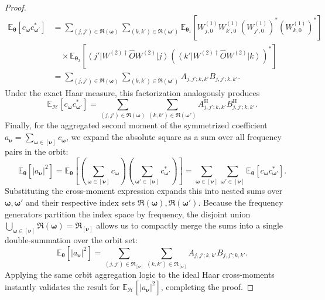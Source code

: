 \documentclass[%
 reprint,
 amsmath,amssymb,
 aps,
 pra,
]{revtex4-2}
\theoremstyle{definition}
\begin{document}
\begin{proof}
\begin{align}
\mathbb{E}_{\bm{\theta}} \left[ c_{\bm{\omega}} c_{\bm{\omega}'}^* \right]
&=
\sum_{(j,j')\in\mathfrak R(\bm{\omega})} \sum_{(k,k')\in\mathfrak R(\bm{\omega}')}
\mathbb{E}_{\bm{\theta}_1} \left[ W^{(1)}_{j,0} W^{(1)}_{k',0} \left(W^{(1)}_{j',0}\right)^* \left(W^{(1)}_{k,0}\right)^* \right] \nonumber \\
&\quad \times
\mathbb{E}_{\bm{\theta}_2} \left[ \left\langle j'\right| W^{(2)\dagger}\hat O W^{(2)} \left|j\right\rangle \left( \left\langle k'\right| W^{(2)\dagger}\hat O W^{(2)} \left|k\right\rangle \right)^* \right] \nonumber \\
&=
\sum_{(j,j')\in\mathfrak R(\bm{\omega})} \sum_{(k,k')\in\mathfrak R(\bm{\omega}')} A_{j,j';k,k'} B_{j,j';k,k'}.
\end{align}
Under the exact Haar measure, this factorization analogously produces
\begin{equation}
\mathbb{E}_{\mathcal{H}} [ c_{\bm{\omega}} c_{\bm{\omega}'}^* ] = \sum_{(j,j')\in\mathfrak R(\bm{\omega})} \sum_{(k,k')\in\mathfrak R(\bm{\omega}')}  A^{\mathrm{H}}_{j,j';k,k'} B^{\mathrm{H}}_{j,j';k,k'}.
\end{equation}
Finally, for the aggregated second moment of the symmetrized coefficient $a_{\bm{\nu}} = \sum_{\bm{\omega}\in[\bm{\nu}]} c_{\bm{\omega}}$, we expand the absolute square as a sum over all frequency pairs in the orbit:
\begin{equation}
\mathbb{E}_{\bm{\theta}} \left[ |a_{\bm{\nu}}|^2 \right]
=
\mathbb{E}_{\bm{\theta}} \left[ \left( \sum_{\bm{\omega}\in[\bm{\nu}]} c_{\bm{\omega}} \right) \left( \sum_{\bm{\omega}'\in[\bm{\nu}]} c_{\bm{\omega}'}^* \right) \right]
=
\sum_{\bm{\omega}\in[\bm{\nu}]} \sum_{\bm{\omega}'\in[\bm{\nu}]} \mathbb{E}_{\bm{\theta}} \left[ c_{\bm{\omega}} c_{\bm{\omega}'}^* \right].
\end{equation}
Substituting the cross-moment expression expands this into nested sums over $\bm{\omega}, \bm{\omega}'$ and their respective index sets $\mathfrak{R}(\bm{\omega}), \mathfrak{R}(\bm{\omega}')$. Because the frequency generators partition the index space by frequency, the disjoint union $\bigcup_{\bm{\omega}\in[\bm{\nu}]} \mathfrak{R}(\bm{\omega}) = \mathfrak{R}_{[\bm{\nu}]}$ allows us to compactly merge the sums into a single double-summation over the orbit set:
\begin{equation}
\mathbb{E}_{\bm{\theta}} \left[ |a_{\bm{\nu}}|^2 \right]
=
\sum_{(j,j') \in \mathfrak{R}_{[\bm{\nu}]}} \sum_{(k,k') \in \mathfrak{R}_{[\bm{\nu}]}} A_{j,j';k,k'} B_{j,j';k,k'}.
\end{equation}
Applying the same orbit aggregation logic to the ideal Haar cross-moments instantly validates the result for $\mathbb{E}_{\mathcal{H}} [ |a_{\bm{\nu}}|^2 ]$, completing the proof.
\end{proof}
\end{document}
